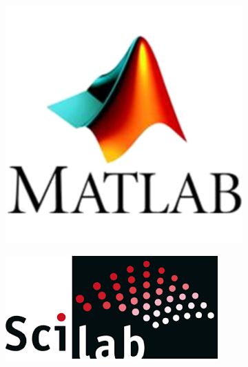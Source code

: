 \documentclass[usenames,dvipsnames]{beamer}
\begin{document}
\begin{frame}
	
\begin{figure}
	\centering
	\begin{subfigure}[b]{0.12\linewidth}
		\includegraphics[width=\linewidth]{imagenes/logoMATLAB}
	\end{subfigure}
	\hspace{0.8cm}
	\begin{subfigure}[b]{0.17\linewidth}
		\includegraphics[width=\linewidth]{imagenes/logoSciLab}
	\end{subfigure}
	
\end{figure}
\end{frame}
\end{document}
